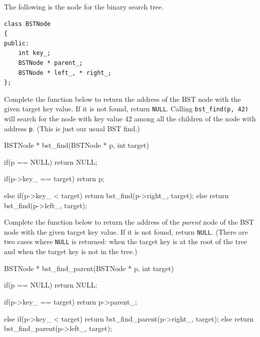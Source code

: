 

The following is the node for the binary search tree.
\begin{Verbatim}[frame=single,fontsize=\footnotesize]
class BSTNode
{
public:
    int key_;
    BSTNode * parent_;
    BSTNode * left_, * right_;
};
\end{Verbatim}

\nextq
Complete the function below to return the address
of the BST node with the given target key value.
If it is not found, return \verb!NULL!.
Calling \verb!bst_find(p, 42)! will search for the node with
key value 42 among all the children of the node with address \verb!p!.
(This is just our usual BST find.)
\\
\ANSWER
\begin{answercode}
BSTNode * bst_find(BSTNode * p, int target)
{
  if(p == NULL)
    return NULL;

  if(p->key_ == target)
    return p;

  else
  {
    if(p->key_ < target)
      return bst_find(p->right_, target);
    else
      return bst_find(p->left_, target);
  }
}
\end{answercode}

\nextq
Complete the function below to return the address
of the \textit{parent} node of the BST node with the given target key value.
If it is not found, return \verb!NULL!.
(There are two cases where \verb!NULL! is returned:
when the target key is at the root of the tree and when the target key
is not in the tree.)
\\
\ANSWER
\begin{answercode}
BSTNode * bst_find_parent(BSTNode * p, int target)
{
  if(p == NULL)
    return NULL;

  if(p->key_ == target)
    return p->parent_;

  else
  {
    if(p->key_ < target)
      return bst_find_parent(p->right_, target);
    else
      return bst_find_parent(p->left_, target);
  }
}
\end{answercode}

